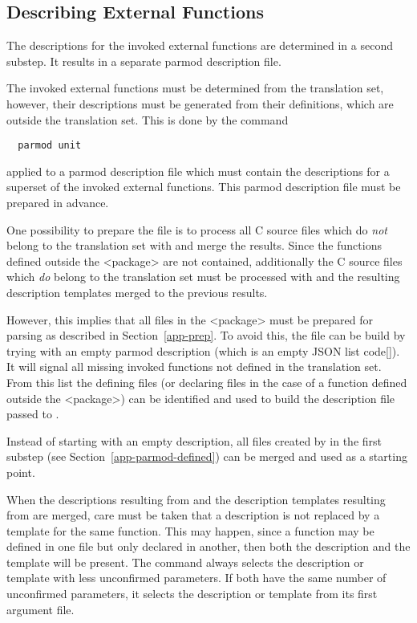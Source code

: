 \subsection{Describing External Functions}
\label{app-parmod-extern}

The descriptions for the invoked external functions are determined in a second substep. It results in 
a separate parmod description file. 

The invoked external functions must be determined from the translation set, however, their descriptions must
be generated from their definitions, which are outside the translation set. This is done by the command
\begin{verbatim}
  parmod unit
\end{verbatim}
applied to a parmod description file which must contain the descriptions for a superset
of the invoked external functions. This parmod description file must be prepared in advance.

One possibility to prepare the file is to process all C source files which do \textit{not} belong to the 
translation set with  and merge the results. Since the functions defined outside the <package>
are not contained, additionally the C source files which \textit{do} belong to the translation set must be
processed with  and the resulting description templates merged to the previous results. 

However, this implies that all files in the
<package> must be prepared for parsing as described in Section~\ref{app-prep}. To avoid this, the file can
be build by trying  with an empty parmod description (which is an empty JSON list code{[]}).
It will signal all missing invoked functions not defined in the translation set. From this list the defining 
files (or declaring files in the case of a function defined outside the <package>) can be identified and used 
to build the description file passed to .

Instead of starting with an empty description, all files created by  in the first substep 
(see Section~\ref{app-parmod-defined}) can be merged and used as a starting point.  

When the descriptions resulting from  and the description templates resulting from 
are merged, care must be taken that a description is not replaced by a template for the same function. This may 
happen, since a function may be defined in one  file but only declared in another, then both the description
and the template will be present. The command  always selects the description or template with less 
unconfirmed parameters. If both have the same number of unconfirmed parameters, it selects the description or template from
its first argument file. 

